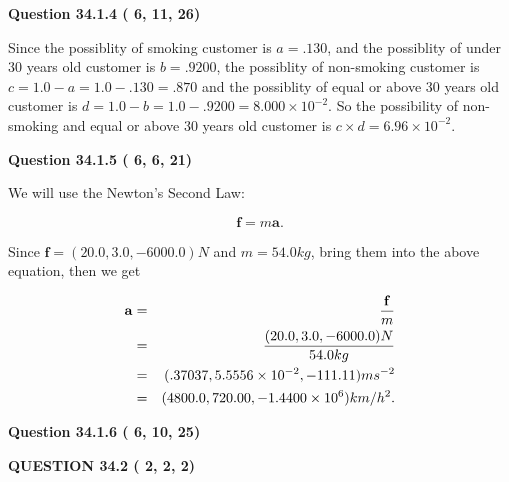 \documentclass[12pt]{article}
\begin{document}
 
 
  
\vspace{0.2in}
  
{\textbf{\Large{Question
34.1.4 
 (          6,         11,         26)
}}}
  
  
 
 

Since the possiblity of  %
smoking customer is $ a =  %
.130 $,
and the possiblity of  %
 under 30 years old customer is $ b =  %
.9200 $,
the possiblity of  %
non-smoking customer is $ c = 1.0 - a = 1.0 -
.130
=  %
.870 $ and the possiblity of  %
equal or above 30 years old
customer is $ d = 1.0 - b = 1.0 -  %
.9200 =  %
8.000 \times 10^{-2}  $.
So the possibility of  %
 non-smoking and  %
equal or above 30 years old
customer is $ c \times d =  %
6.96 \times 10^{-2} $.
 
 
 
  
\vspace{0.2in}
  
{\textbf{\Large{Question
34.1.5 
 (          6,          6,         21)
}}}
  
  
 
 

We will use the Newton's Second Law:
 
\[
\mathbf{f}=m\mathbf{a}.
\]
 
Since $\mathbf{f}=( %
20.0,  %
3.0,  %
-6000.0 )N$
and $m= %
54.0 kg$, bring them into the above equation, then we get
 
\begin{eqnarray*}
\mathbf{a}&=&\frac{\mathbf{f}}m  \\
&=&\frac{(
20.0 ,
3.0 ,
-6000.0 )N
}{ %
54.0 kg}  \\
&=&(
.37037 ,
5.5556 \times 10^{-2},
-111.11
)ms^{-2} \\
&=&(
4800.0 ,
720.00 ,
-1.4400 \times 10^{6}
)km/h^2.
\end{eqnarray*}
 
 
 
  
\vspace{0.2in}
  
{\textbf{\Large{Question
34.1.6 
 (          6,         10,         25)
}}}
  
  
  
\vspace{0.2in}
  
{\textbf{\Large{QUESTION
34.2 
 (          2,          2,          2)
}}}
  
  
 
 
\end{document}
